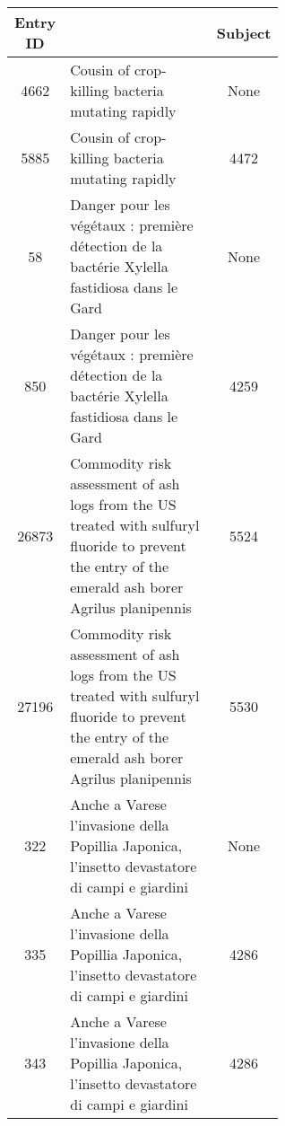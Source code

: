 
\begin{table}[!htbp]
  \centering


  \begin{tabular}{|c|p{0.6\linewidth}|c|}
    \hline
    \textbf{Entry ID} & \textbf{\trafilaturaTitle{}} & \textbf{Subject} \\
    \hline
    4662 & Cousin of crop-killing bacteria mutating rapidly & None \\
    5885 & Cousin of crop-killing bacteria mutating rapidly & 4472 \\ \hline
    58 & Danger pour les végétaux : première détection de la bactérie Xylella fastidiosa dans le Gard & None \\
    850 & Danger pour les végétaux : première détection de la bactérie Xylella fastidiosa dans le Gard & 4259 \\ \hline
    26873 & Commodity risk assessment of ash logs from the US treated with sulfuryl fluoride to prevent the entry of the emerald ash borer Agrilus planipennis & 5524 \\
    27196 & Commodity risk assessment of ash logs from the US treated with sulfuryl fluoride to prevent the entry of the emerald ash borer Agrilus planipennis & 5530 \\ \hline
    322 & Anche a Varese l'invasione della Popillia Japonica, l'insetto devastatore di campi e giardini & None \\
    335 & Anche a Varese l'invasione della Popillia Japonica, l'insetto devastatore di campi e giardini & 4286 \\
    343 & Anche a Varese l'invasione della Popillia Japonica, l'insetto devastatore di campi e giardini & 4286 \\
    \hline
  \end{tabular}


\end{table}
